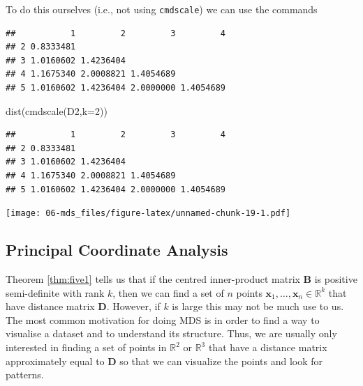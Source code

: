 \documentclass[
]{book}
\newenvironment{Shaded}{\begin{snugshade}}{\end{snugshade}}
\newcommand{\AttributeTok}[1]{\textcolor[rgb]{0.77,0.63,0.00}{#1}}
\newcommand{\DecValTok}[1]{\textcolor[rgb]{0.00,0.00,0.81}{#1}}
\newcommand{\FunctionTok}[1]{\textcolor[rgb]{0.00,0.00,0.00}{#1}}
\newcommand{\NormalTok}[1]{#1}
\newcommand{\OtherTok}[1]{\textcolor[rgb]{0.56,0.35,0.01}{#1}}
\newcommand{\SpecialCharTok}[1]{\textcolor[rgb]{0.00,0.00,0.00}{#1}}
\theoremstyle{definition}
\theoremstyle{definition}
\theoremstyle{definition}
\theoremstyle{definition}
\theoremstyle{remark}
\begin{document}
To do this ourselves (i.e., not using \texttt{cmdscale}) we can use the commands

\begin{Shaded}
\end{Shaded}

\begin{verbatim}
##           1         2         3         4
## 2 0.8333481                              
## 3 1.0160602 1.4236404                    
## 4 1.1675340 2.0008821 1.4054689          
## 5 1.0160602 1.4236404 2.0000000 1.4054689
\end{verbatim}

\begin{Shaded}
\begin{Highlighting}[]
\FunctionTok{dist}\NormalTok{(}\FunctionTok{cmdscale}\NormalTok{(D2,}\AttributeTok{k=}\DecValTok{2}\NormalTok{))}
\end{Highlighting}
\end{Shaded}

\begin{verbatim}
##           1         2         3         4
## 2 0.8333481                              
## 3 1.0160602 1.4236404                    
## 4 1.1675340 2.0008821 1.4054689          
## 5 1.0160602 1.4236404 2.0000000 1.4054689
\end{verbatim}

\texttt{[image: 06-mds\_files/figure-latex/unnamed-chunk-19-1.pdf]}

\hypertarget{principal-coordinate-analysis}{%
\subsection{Principal Coordinate Analysis}\label{principal-coordinate-analysis}}

Theorem \ref{thm:five1} tells us that if the centred inner-product matrix
\(\mathbf B\) is positive semi-definite with rank \(k\), then we can find a set of \(n\) points \(\mathbf x_1,\ldots, \mathbf x_n \in \mathbb{R}^k\) that have distance matrix \(\mathbf D\). However, if \(k\) is large this may not be much use to us. The most common motivation for doing MDS is in order to find a way to visualise a dataset and to understand its structure. Thus, we are usually only interested in finding a set of points in \(\mathbb{R}^2\) or \(\mathbb{R}^3\) that have a distance matrix approximately equal to \(\mathbf D\) so that we can visualize the points and look for patterns.
\end{document}
